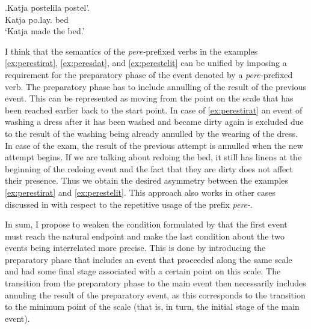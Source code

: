 \exg.\label{ex:postelit}Katja postelila postel'.\\
Katja po.lay. bed\\
\trans `Katja made the bed.'

I think that the semantics of the \textit{pere-}prefixed verbs in the examples \ref{ex:perestirat}, \ref{ex:peresdat}, and \ref{ex:perestelit} can be unified by imposing a requirement for the preparatory phase of the event denoted by a \textit{pere-}prefixed verb. The preparatory phase has to include annulling of the result of the previous event. This can be represented as moving from the point on the scale that has been reached earlier back to the start point. In case of \ref{ex:perestirat} an event of washing a dress after it has been washed and became dirty again is excluded due to the result of the washing being already annulled by the wearing of the dress. In case of the exam, the result of the previous attempt is annulled when the new attempt begins. If we are talking about redoing the bed, it still has linens at the beginning of the redoing event and the fact that they are dirty does not affect their presence. Thus we obtain the desired asymmetry between the examples \ref{ex:perestirat} and \ref{ex:perestelit}. This approach also works in other cases discussed in \citealt{Kagan:book} with respect to the repetitive usage of the prefix \textit{pere-}.

In sum, I propose to weaken the condition formulated by \citet{Kagan:book} that the first event must reach the natural endpoint and make the last condition about the two events being interrelated more precise. This is done by introducing the preparatory phase that includes an event that proceeded along the same scale and had some final stage associated with a certain point on this scale. The transition from the preparatory phase to the main event then necessarily includes annuling the result of the preparatory event, as this corresponds to the transition to the minimum point of the scale (that is, in turn, the initial stage of the main event).

